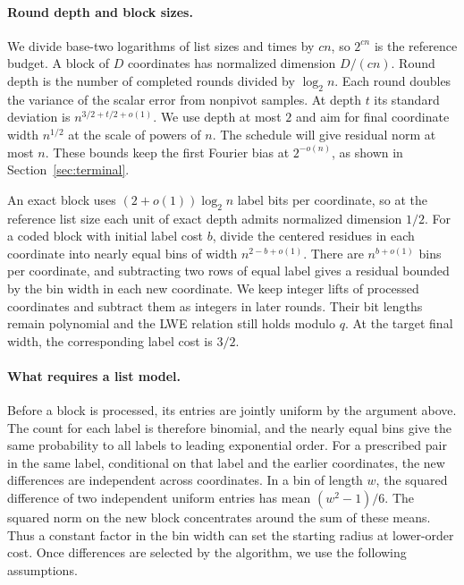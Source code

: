 \documentclass[runningheads,envcountsame,envcountsect,orivec]{llncs}
\begin{document}
\paragraph{Round depth and block sizes.}
We divide base-two logarithms of list sizes and times by $cn$,
so $2^{cn}$ is the reference budget. A block of $D$ coordinates
has normalized dimension $D/(cn)$. Round depth is the number
of completed rounds divided by $\log_2 n$. Each round doubles
the variance of the scalar error from nonpivot samples. At depth
$t$ its standard deviation is $n^{3/2+t/2+o(1)}$.
We use depth at most $2$ and aim for final coordinate width
$n^{1/2}$ at the scale of powers of $n$. The schedule will give
residual norm at most $n$. These bounds keep the first Fourier
bias at $2^{-o(n)}$, as shown in Section~\ref{sec:terminal}.

An exact block uses $(2+o(1))\log_2 n$ label bits per coordinate,
so at the reference list size each unit of exact depth admits
normalized dimension $1/2$.
For a coded block with initial label cost $b$, divide the centered
residues in each coordinate into nearly equal bins of width
$n^{2-b+o(1)}$. There are $n^{b+o(1)}$ bins per coordinate, and
subtracting two rows of equal label gives a residual bounded by
the bin width in each new coordinate. We keep integer lifts
of processed coordinates and subtract them as integers in
later rounds. Their bit lengths remain polynomial and the
LWE relation still holds modulo $q$. At the target final
width, the corresponding label cost is $3/2$.

\paragraph{What requires a list model.}
Before a block is processed, its entries are jointly uniform by the
argument above. The count for each label is therefore binomial,
and the nearly equal bins give the same probability to all labels
to leading exponential order.
For a prescribed pair in the same label, conditional on that label
and the earlier coordinates, the new differences are independent
across coordinates. In a bin of length $w$, the squared difference
of two independent uniform entries has mean $(w^2-1)/6$.
The squared norm on the new block concentrates around the sum
of these means. Thus a constant factor in the bin width can
set the starting radius at lower-order cost. Once differences
are selected by the algorithm, we use the following assumptions.
\end{document}
